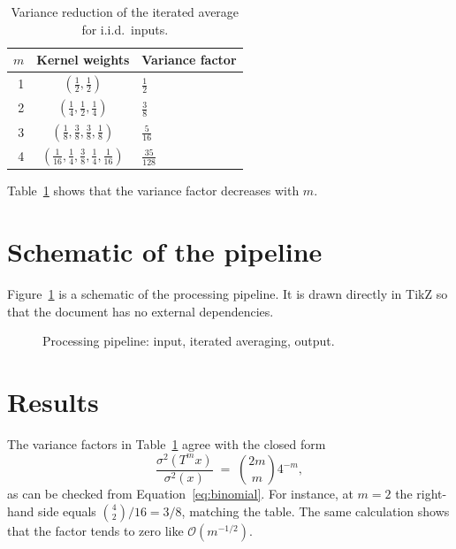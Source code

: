 \documentclass[11pt,a4paper]{article}
\begin{document}
\begin{table}[ht]
  \centering
  \begin{tabular}{rcl}
    \toprule
    $m$ & Kernel weights & Variance factor \\
    \midrule
    1 & $(\tfrac12,\tfrac12)$ & $\tfrac12$ \\
    2 & $(\tfrac14,\tfrac12,\tfrac14)$ & $\tfrac38$ \\
    3 & $(\tfrac18,\tfrac38,\tfrac38,\tfrac18)$ & $\tfrac{5}{16}$ \\
    4 & $(\tfrac1{16},\tfrac14,\tfrac38,\tfrac14,\tfrac1{16})$ & $\tfrac{35}{128}$ \\
    \bottomrule
  \end{tabular}
  \caption{Variance reduction of the iterated average for i.i.d.\ inputs.}
  \label{tab:variance}
\end{table}

Table~\ref{tab:variance} shows that the variance factor decreases with $m$.

\section{Schematic of the pipeline}\label{sec:pipeline}

Figure~\ref{fig:pipeline} is a schematic of the processing pipeline. It is
drawn directly in TikZ so that the document has no external dependencies.

\begin{figure}[ht]
  \centering
  \caption{Processing pipeline: input, iterated averaging, output.}
  \label{fig:pipeline}
\end{figure}

\section{Results}\label{sec:results}

The variance factors in Table~\ref{tab:variance} agree with the closed form
\begin{equation}\label{eq:closed}
  \frac{\sigma^2(T^m x)}{\sigma^2(x)} \;=\; \binom{2m}{m}4^{-m},
\end{equation}
as can be checked from Equation~\eqref{eq:binomial}. For instance, at $m=2$
the right-hand side equals $\binom{4}{2}/16 = 3/8$, matching the table. The
same calculation shows that the factor tends to zero like $\mathcal{O}(m^{-1/2})$.
\end{document}
